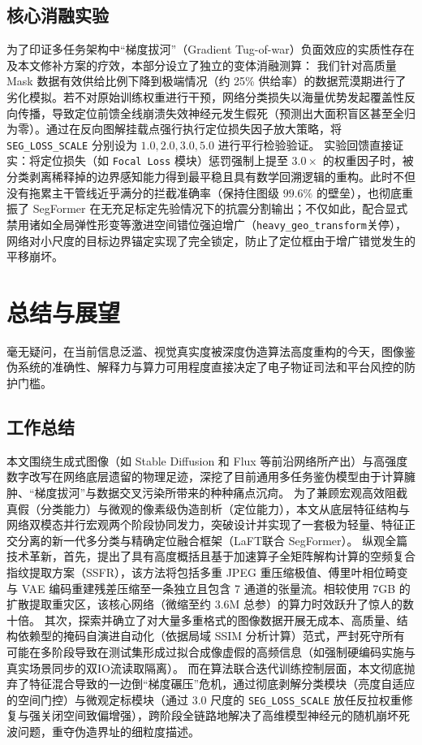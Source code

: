 \documentclass[UTF8, a4paper, 12pt]{ctexrep}
\begin{document}
\section{核心消融实验}
为了印证多任务架构中“梯度拔河”（Gradient Tug-of-war）负面效应的实质性存在及本文修补方案的疗效，本部分设立了独立的变体消融测算：
我们针对高质量 Mask 数据有效供给比例下降到极端情况（约 25\% 供给率）的数据荒漠期进行了劣化模拟。若不对原始训练权重进行干预，网络分类损失以海量优势发起覆盖性反向传播，导致定位前馈全线崩溃失效神经元发生假死（预测出大面积盲区甚至全归为零）。通过在反向图解挂载点强行执行定位损失因子放大策略，将 \texttt{SEG\_LOSS\_SCALE} 分别设为 ${1.0, 2.0, 3.0, 5.0}$ 进行平行检验验证。
实验回馈直接证实：将定位损失（如 \texttt{Focal Loss} 模块）惩罚强制上提至 $3.0 \times$ 的权重因子时，被分类剥离稀释掉的边界感知能力得到最平稳且具有数学回溯逻辑的重构。此时不但没有拖累主干管线近乎满分的拦截准确率（保持住图级 $99.6\%$ 的壁垒），也彻底重振了 SegFormer 在无充足标定先验情况下的抗震分割输出；不仅如此，配合显式禁用诸如全局弹性形变等激进空间错位强迫增广（\texttt{heavy\_geo\_transform}关停），网络对小尺度的目标边界锚定实现了完全锁定，防止了定位框由于增广错觉发生的平移崩坏。


\chapter{总结与展望}
毫无疑问，在当前信息泛滥、视觉真实度被深度伪造算法高度重构的今天，图像鉴伪系统的准确性、解释力与算力可用程度直接决定了电子物证司法和平台风控的防护门槛。

\section{工作总结}
本文围绕生成式图像（如 Stable Diffusion 和 Flux 等前沿网络所产出）与高强度数字改写在网络底层遗留的物理足迹，深挖了目前通用多任务鉴伪模型由于计算臃肿、“梯度拔河”与数据交叉污染所带来的种种痛点沉疴。
为了兼顾宏观高效阻截真假（分类能力）与微观的像素级伪造剖析（定位能力），本文从底层特征结构与网络双模态并行宏观两个阶段协同发力，突破设计并实现了一套极为轻量、特征正交分离的新一代多分类与精确定位融合框架（LaFT联合 SegFormer）。
纵观全篇技术革新，首先，提出了具有高度概括且基于加速算子全矩阵解构计算的空频复合指纹提取方案（SSFR），该方法将包括多重 JPEG 重压缩极值、傅里叶相位畸变与 VAE 编码重建残差压缩至一条独立且包含 7 通道的张量流。相较使用 7GB 的扩散提取重灾区，该核心网络（微缩至约 3.6M 总参）的算力时效跃升了惊人的数十倍。
其次，探索并确立了对大量多重格式的图像数据开展无成本、高质量、结构依赖型的掩码自演进自动化（依据局域 SSIM 分析计算）范式，严封死守所有可能在多阶段导致在测试集形成过拟合成像虚假的高频信息（如强制硬编码实施与真实场景同步的双IO流读取隔离）。
而在算法联合迭代训练控制层面，本文彻底抛弃了特征混合导致的一边倒“梯度碾压”危机，通过彻底剥解分类模块（亮度自适应的空间门控）与微观定标模块（通过 $3.0$ 尺度的 \texttt{SEG\_LOSS\_SCALE} 放任反拉权重修复与强关闭空间致偏增强），跨阶段全链路地解决了高维模型神经元的随机崩坏死波问题，重夺伪造界址的细粒度描述。
\end{document}
